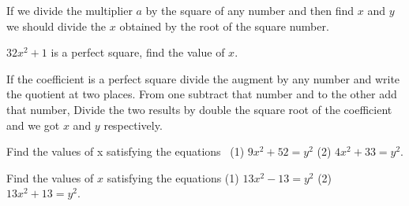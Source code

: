 \documentclass[]{article}
\begin{document}
{{If we divide the multiplier $a$ by the square of any number and then find $x$ and $y$ we should divide the $x$ obtained by the root of the square
number. }

\begin{quote}  {
}  \end{quote}

$32x^{2 } + 1$ is a perfect square, find the value of $x$.

\begin{quote}  {
}  \end{quote}

{If the coefficient is a perfect square divide the augment by any number
and write the quotient at two places. From one subtract that number and
to the other add that number, Divide the two results by double the
square root of the coefficient and we got $x$ and $y$ respectively.}

\begin{quote}  {
}  \end{quote}

\newpage
\large

{Find the values of x satisfying the equations ~(1) $9x^{2} + 52 = y^{2}$ (2) $4x^{2} + 33 =y^{2}$}.

\begin{quote}  {
}  \end{quote}

{Find the values of $x$ satisfying the equations (1) $13x^{2} -13 =y^{2}$ (2) $13x^{2} + 13 =y^{2}.$}

\begin{quote}  {
}  \end{quote}

}
\end{document}
